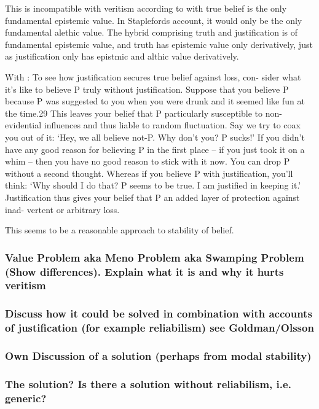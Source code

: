 \documentclass[12pt,numbers=noenddot]{scrartcl}
\begin{document}
This is incompatible with veritism according to with true belief is the only fundamental epistemic value. In Staplefords account, it would only be the only fundamental alethic value. The hybrid comprising truth and justification is of fundamental epistemic value, and truth has epistemic value only derivatively, just as justification only has epistmic and althic value derivatively.

With \textcite{Stapleford2016}:
To see how justification secures true belief against loss, con- sider what it’s like to believe P truly without justification. Suppose that you believe P because P was suggested to you when you were drunk and it seemed like fun at the time.29 This leaves your belief that P particularly susceptible to non-evidential influences and thus liable to random fluctuation. Say we try to coax you out of it: ‘Hey, we all believe not-P. Why don’t you? P sucks!’ If you didn’t have any good reason for believing P in the first place – if you just took it on a whim – then you have no good reason to stick with it now. You can drop P without a second thought. Whereas if you believe P with justification, you’ll think: ‘Why should I do that? P seems to be true. I am justified in keeping it.’ Justification thus gives your belief that P an added layer of protection against inad- vertent or arbitrary loss.

This seems to be a reasonable approach to stability of belief.


\subsubsection{ Value Problem aka Meno Problem aka Swamping Problem (Show differences). Explain what it is and why it hurts veritism }
\subsubsection{ Discuss how it could be solved in combination with accounts of justification (for example reliabilism) see Goldman/Olsson}
\subsubsection{ Own Discussion of a solution (perhaps from modal stability)}
\subsubsection{ The solution? Is there a solution without reliabilism, i.e. generic?}
\end{document}
